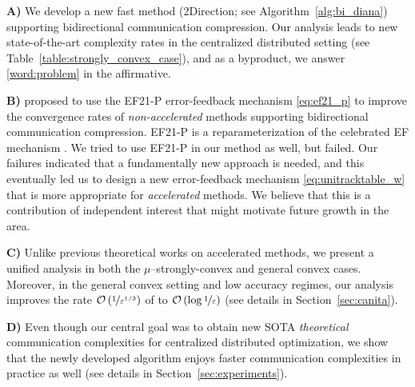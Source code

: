 \documentclass{article} %
\newcommand{\cO}{\mathcal{O}}
\theoremstyle{plain}
\theoremstyle{definition}
\theoremstyle{remark}
\newcommand{\green}{\color{mydarkgreen}}
\newcommand{\algname}[1]{{\small\green\sf #1}}
\begin{document}
\phantom{X} {\bf A)} We develop a new fast method (\algname{2Direction}; see Algorithm~\ref{alg:bi_diana}) supporting bidirectional communication compression. Our analysis leads to new state-of-the-art complexity rates in the centralized distributed setting (see Table~\ref{table:strongly_convex_case}), and as a byproduct, we answer \ref{word:problem} in the affirmative.

\phantom{X} {\bf B)} \citet{gruntkowska2022ef21} proposed to use the \algname{EF21-P} error-feedback mechanism \eqref{eq:ef21_p} to improve the convergence rates of  \emph{non-accelerated} methods supporting bidirectional communication compression. \algname{EF21-P} is a reparameterization of the celebrated \algname{EF} mechanism \citep{Seide2014}. We tried to use \algname{EF21-P} in our method as well, but failed. Our failures indicated that a fundamentally new approach is needed, and this eventually led us to design a new error-feedback mechanism \eqref{eq:unitracktable_w} that is more appropriate for \emph{accelerated} methods. We believe that this  is a contribution of independent interest that might motivate future growth in the area.

\phantom{X} {\bf C)} Unlike previous theoretical works \citep{ADIANA, li2021canita} on accelerated methods, we present a unified analysis  in both the $\mu$--strongly-convex and general convex cases. Moreover, in the general convex setting and low accuracy regimes, our analysis improves the rate $\cO\left(\nicefrac{1}{\varepsilon^{1/3}}\right)$ of \citet{li2021canita} to $\cO\left(\log \nicefrac{1}{\varepsilon}\right)$ (see details in Section~\ref{sec:canita}).

\phantom{X} {\bf D)} Even though our central goal was to obtain new SOTA \emph{theoretical} communication complexities for centralized distributed optimization, we show that the newly developed algorithm enjoys faster communication complexities in practice
as well (see details in Section~\ref{sec:experiments}).
\end{document}
